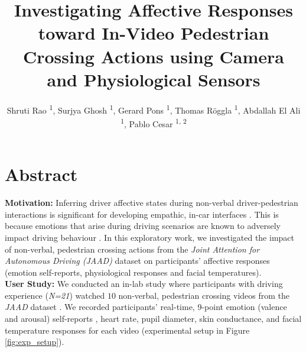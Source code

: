 \documentclass[acmlarge]{acmart}
\begin{document}
\title{Investigating Affective Responses toward In-Video Pedestrian Crossing Actions using Camera and Physiological Sensors}

\author{Shruti Rao \textsuperscript{1},
    Surjya Ghosh \textsuperscript{1},
    Gerard Pons \textsuperscript{1},
    Thomas R\"{o}ggla \textsuperscript{1},
    Abdallah El Ali \textsuperscript{1},
    Pablo Cesar \textsuperscript{1, 2}}

\renewcommand\shortauthors{Rao et al.}


\maketitle

\section*{Abstract}
\textbf{Motivation:} 
Inferring driver affective states during non-verbal driver-pedestrian interactions is significant for developing empathic, in-car interfaces \cite{koch2021drivers}. This is because emotions that arise during driving scenarios are known to adversely impact driving behaviour \cite{2015:tf:jeon, sucha2017pedestrian, locken2019should}. In this exploratory work, we investigated the impact of non-verbal, pedestrian crossing actions from the \textit{Joint Attention for Autonomous Driving (JAAD)} \cite{2017:IV:rasouli} dataset on participants’  affective responses (emotion self-reports, physiological responses and facial temperatures). 
\\


\noindent \textbf{User Study:}  
We conducted an in-lab study where participants with driving experience (\textit{N=21}) watched $10$ non-verbal, pedestrian crossing videos from the \textit{JAAD} dataset \cite{2017:IV:rasouli, Ghosh2022}. We recorded participants' real-time, 9-point emotion (valence and arousal) self-reports \cite{bradley1994measuring}, heart rate, pupil diameter, skin conductance, and facial temperature responses for each video (experimental setup in Figure \ref{fig:exp_setup}).
\\
\end{document}
